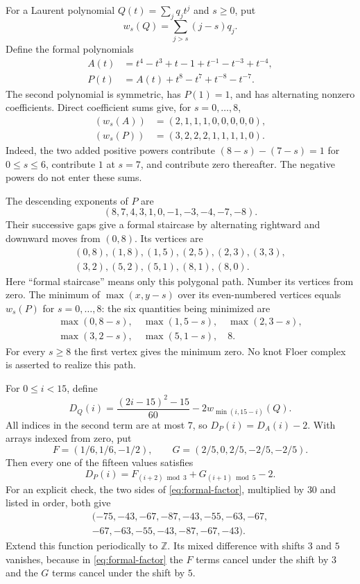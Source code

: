\documentclass[11pt]{article}
\theoremstyle{remark}
\newcommand{\Z}{\mathbb Z}
\begin{document}

For a Laurent polynomial $Q(t)=\sum_jq_jt^j$ and $s\geq0$, put
\[
 w_s(Q)=\sum_{j>s}(j-s)q_j.
\]
Define the formal polynomials
\begin{align*}
 A(t)&=t^4-t^3+t-1+t^{-1}-t^{-3}+t^{-4},\\
 P(t)&=A(t)+t^8-t^7+t^{-8}-t^{-7}.
\end{align*}
The second polynomial is symmetric, has $P(1)=1$, and has alternating nonzero coefficients. Direct coefficient sums give, for $s=0,\ldots,8$,
\begin{align*}
 (w_s(A))&=(2,1,1,1,0,0,0,0,0),\\
 (w_s(P))&=(3,2,2,2,1,1,1,1,0).
\end{align*}
Indeed, the two added positive powers contribute $(8-s)-(7-s)=1$ for $0\leq s\leq6$, contribute $1$ at $s=7$, and contribute zero thereafter. The negative powers do not enter these sums.

The descending exponents of $P$ are
\[
 (8,7,4,3,1,0,-1,-3,-4,-7,-8).
\]
Their successive gaps give a formal staircase by alternating rightward and downward moves from $(0,8)$. Its vertices are
\[
 \begin{gathered}
 (0,8),(1,8),(1,5),(2,5),(2,3),(3,3),\\
 (3,2),(5,2),(5,1),(8,1),(8,0).
 \end{gathered}
\]
Here ``formal staircase'' means only this polygonal path. Number its vertices from zero. The minimum of $\max(x,y-s)$ over its even-numbered vertices equals $w_s(P)$ for $s=0,\ldots,8$: the six quantities being minimized are
\[
 \begin{gathered}
 \max(0,8-s),\quad \max(1,5-s),\quad \max(2,3-s),\\
 \max(3,2-s),\quad \max(5,1-s),\quad 8.
 \end{gathered}
\]
For every $s\geq8$ the first vertex gives the minimum zero. No knot Floer complex is asserted to realize this path.

For $0\leq i<15$, define
\[
 D_Q(i)=\frac{(2i-15)^2-15}{60}-2w_{\min(i,15-i)}(Q).
\]
All indices in the second term are at most $7$, so $D_P(i)=D_A(i)-2$. With arrays indexed from zero, put
\[
 F=(1/6,1/6,-1/2),\qquad
 G=(2/5,0,2/5,-2/5,-2/5).
\]
Then every one of the fifteen values satisfies
\begin{equation}\label{eq:formal-factor}
 D_P(i)=F_{(i+2)\bmod3}+G_{(i+1)\bmod5}-2.
\end{equation}
For an explicit check, the two sides of \eqref{eq:formal-factor}, multiplied by $30$ and listed in order, both give
\[
 \begin{gathered}
 (-75,-43,-67,-87,-43,-55,-63,-67,\\
 -67,-63,-55,-43,-87,-67,-43).
 \end{gathered}
\]
Extend this function periodically to $\Z$. Its mixed difference with shifts $3$ and $5$ vanishes, because in \eqref{eq:formal-factor} the $F$ terms cancel under the shift by $3$ and the $G$ terms cancel under the shift by $5$.
\end{document}
